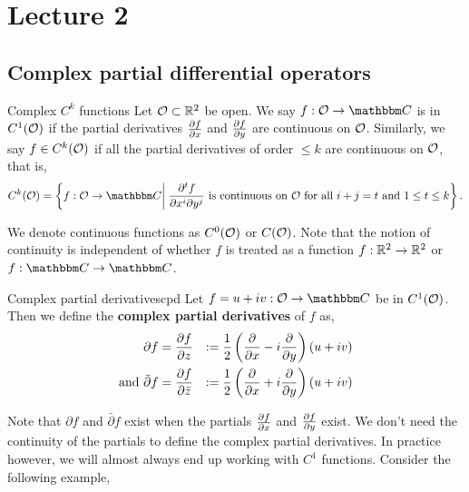 \documentclass[../ComplexAnalysis_Notes.tex]{subfiles}
\begin{document}
\chapter*{Lecture 2} %
\setcounter{chapter}{2} %
\setcounter{section}{0}
\setcounter{equation}{0}
\setcounter{figure}{0}


\section{Complex partial differential operators}

\begin{Def}{Complex \(C^k\) functions}{}
  Let \(\mathcal{O} \subset \mathbb{R}^2\) be open. We say \(f : \mO \to \C\) is in \(C^1(\mathcal{O})\) if the partial derivatives \(\pdv{f}{x}\) and \(\pdv{f}{y}\) are continuous on \(\mathcal{O}\). Similarly, we say \(f \in C^k(\mathcal{O})\) if all the partial derivatives of order \(\leq k\) are continuous on \(\mathcal{O}\), that is,
  \[
    C^k(\mO) = \left\{ f : \mO \to \C \bigg\rvert \; \frac{\partial^t f}{\partial x^i \partial y^j} \text{ is continuous on } \mO \text{ for all } i+j = t \text{ and } 1 \leq t \leq k  \right\}.
  \]
\end{Def}

We denote continuous functions as \(C^0(\mathcal{O})\) or \(C(\mathcal{O})\). Note that the notion of continuity is independent of whether $f$ is treated as a function \(f:\mathbb{R}^2 \to \mathbb{R}^2\) or \(f:\C \to \C\).

\begin{Def}{Complex partial derivatives}{cpd}
  Let \(f = u + iv : \mO\to \C\) be in \(C^1(\mathcal{O})\). Then we define the \textbf{complex partial derivatives} of \(f\) as,
  \begin{alignat*}{2}
    {\partial f}                   & = \pdv{f}{z}       & := \frac 12 \left( \pdv{x} - i \pdv{y} \right)(u + iv) \\
    \text{and } {\bar{\partial} f} & = \pdv{f}{\bar{z}} & := \frac 12 \left( \pdv{x} + i \pdv{y} \right)(u + iv)
  \end{alignat*}
\end{Def}

Note that \({\partial f}\) and \({\bar{\partial} f}\) exist when the partials \(\pdv{f}{x}\) and \(\pdv{f}{y}\) exist. We don't need the continuity of the partials to define the complex partial derivatives. In practice however, we will almost always end up working with \(C^1\) functions. Consider the following example,
\end{document}
